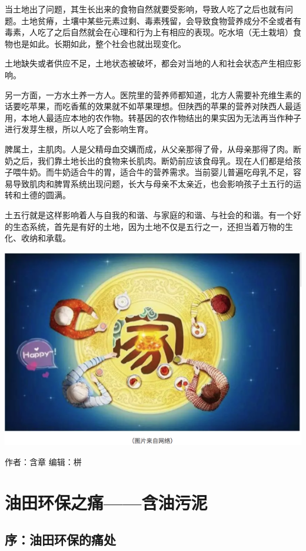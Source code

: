 \documentclass[]{book}
\begin{document}
当土地出了问题，其生长出来的食物自然就要受影响，导致人吃了之后也就有问题。土地贫瘠，土壤中某些元素过剩、毒素残留，会导致食物营养成分不全或者有毒素，人吃了之后自然就会在心理和行为上有相应的表现。吃水培（无土栽培）食物也是如此。长期如此，整个社会也就出现变化。

土地缺失或者供应不足，土地状态被破坏，都会对当地的人和社会状态产生相应影响。

另一方面，一方水土养一方人。医院里的营养师都知道，北方人需要补充维生素的话要吃苹果，而吃香蕉的效果就不如苹果理想。但陕西的苹果的营养对陕西人最适用，本地人最适应本地的农作物。转基因的农作物结出的果实因为无法再当作种子进行发芽生根，所以人吃了会影响生育。

脾属土，主肌肉。人是父精母血交媾而成，从父亲那得了骨，从母亲那得了肉。断奶之后，我们靠土地长出的食物来长肌肉。断奶前应该食母乳。现在人们都是给孩子喂牛奶。而牛奶适合牛的胃，适合牛的营养需求。当前婴儿普遍吃母乳不足，容易导致肌肉和脾胃系统出现问题，长大与母亲不太亲近，也会影响孩子土五行的运转和土德的圆满。

土五行就是这样影响着人与自我的和谐、与家庭的和谐、与社会的和谐。有一个好的生态系统，首先是有好的土地，因为土地不仅是五行之一，还担当着万物的生化、收纳和承载。

\includegraphics[width=8.33in]{images/swr4}

作者：含章 编辑：栟

\section{油田环保之痛------含油污泥}

\subsection{序：油田环保的痛处}
\end{document}
